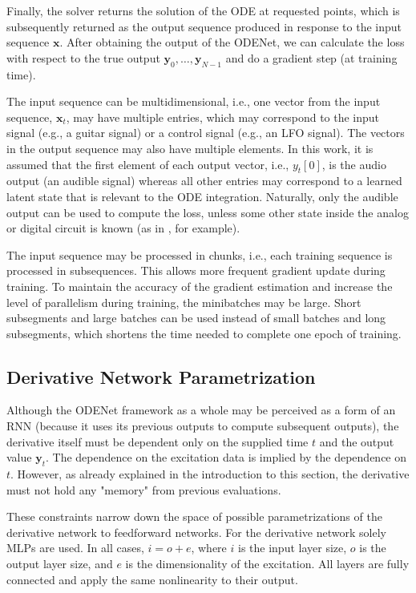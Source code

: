 Finally, the solver returns the solution of the \ac{ODE} at requested points, which is subsequently returned as the output sequence produced in response to the input sequence $\pmb{x}$. After obtaining the output of the ODENet, we can calculate the loss with respect to the true output $\pmb{y}_0, \dots, \pmb{y}_{N-1}$ and do a gradient step (at training time).

The input sequence can be multidimensional, i.e., one vector from the input sequence, $\pmb{x}_t$, may have multiple entries, which may correspond to the input signal (e.g., a guitar signal) or a control signal (e.g., an \ac{LFO} signal). The vectors in the output sequence may also have multiple elements. In this work, it is assumed that the first element of each output vector, i.e., $y_t[0]$, is the audio output (an audible signal) whereas all other entries may correspond to a learned latent state that is relevant to the \ac{ODE} integration. Naturally, only the audible output can be used to compute the loss, unless some other state inside the analog or digital circuit is known (as in \cite{Parker2019}, for example).

The input sequence may be processed in chunks, i.e., each training sequence is processed in subsequences. This allows more frequent gradient update during training. To maintain the accuracy of the gradient estimation and increase the level of parallelism during training, the minibatches may be large. Short subsegments and large batches can be used instead of small batches and long subsegments, which shortens the time needed to complete one epoch of training.

\subsection{Derivative Network Parametrization}
\label{subsec:derivative_parametrization}

Although the ODENet framework as a whole may be perceived as a form of an \ac{RNN} (because it uses its previous outputs to compute subsequent outputs), the derivative itself must be dependent only on the supplied time $t$ and the output value $\pmb{y}_t$. The dependence on the excitation data is implied by the dependence on $t$. However, as already explained in the introduction to this section, the derivative must not hold any "memory" from previous evaluations.

These constraints narrow down the space of possible parametrizations of the derivative network to feedforward networks. For the derivative network solely \acp{MLP} are used. In all cases, $i = o + e$, where $i$ is the input layer size, $o$ is the output layer size, and $e$ is the dimensionality of the excitation. All layers are fully connected and apply the same nonlinearity to their output.
